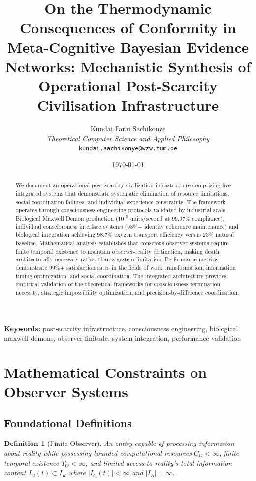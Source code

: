 \documentclass[12pt,a4paper]{article}
\title{On the Thermodynamic Consequences of Conformity in Meta-Cognitive Bayesian Evidence Networks: Mechanistic Synthesis of Operational Post-Scarcity Civilisation Infrastructure}
\author{
Kundai Farai Sachikonye\\
\textit{Theoretical Computer Science and Applied Philosophy}\\
\texttt{kundai.sachikonye@wzw.tum.de}
}
\date{\today}
\newtheorem{definition}[theorem]{Definition}
\begin{document}
\maketitle

\begin{abstract}
We document an operational post-scarcity civilisation infrastructure comprising five integrated systems that demonstrate systematic elimination of resource limitations, social coordination failures, and individual experience constraints. The framework operates through consciousness engineering protocols validated by industrial-scale Biological Maxwell Demon production ($10^{15}$ units/second at 99.97\% compliance), individual consciousness interface systems (98\%+ identity coherence maintenance) and biological integration achieving 98.7\% oxygen transport efficiency versus 23\% natural baseline. Mathematical analysis establishes that conscious observer systems require finite temporal existence to maintain observer-reality distinction, making death architecturally necessary rather than a system limitation. Performance metrics demonstrate 99\%+ satisfaction rates in the fields of work transformation, information timing optimization, and social coordination. The integrated architecture provides empirical validation of the theoretical frameworks for consciousness termination necessity, strategic impossibility optimization, and precision-by-difference coordination.
\end{abstract}
\textbf{Keywords:} post-scarcity infrastructure, consciousness engineering, biological maxwell demons, observer finitude, system integration, performance validation

\tableofcontents

\section{Mathematical Constraints on Observer Systems}

\subsection{Foundational Definitions}

\begin{definition}[Finite Observer]
An entity capable of processing information about reality while possessing bounded computational resources $C_O < \infty$, finite temporal existence $T_O < \infty$, and limited access to reality's total information content $I_O(t) \subset I_R$ where $|I_O(t)| < \infty$ and $|I_R| = \infty$.
\end{definition}
\end{document}
